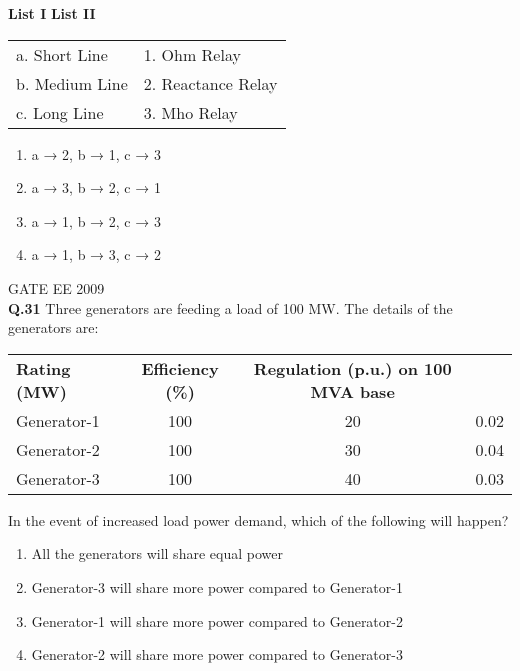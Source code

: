 \documentclass[12pt]{article}
\begin{document}
\vspace{0.3cm}

\noindent\textbf{List I} \hfill \textbf{List II}

\begin{tabular}{ll}
a. Short Line & 1. Ohm Relay \\
b. Medium Line & 2. Reactance Relay \\
c. Long Line & 3. Mho Relay \\
\end{tabular}

\vspace{0.3cm}

\begin{enumerate}
    \item a → 2, b → 1, c → 3
    \item a → 3, b → 2, c → 1
    \item a → 1, b → 2, c → 3
    \item a → 1, b → 3, c → 2
\end{enumerate}

\vspace{0.5cm}
\hspace{10pt}
GATE EE 2009\\
\noindent\textbf{Q.31} Three generators are feeding a load of 100 MW. The details of the generators are:

\vspace{0.3cm}

\begin{tabular}{lccc}
\textbf{Rating (MW)} & \textbf{Efficiency (\%)} & \textbf{Regulation (p.u.) on 100 MVA base} \\
Generator-1 & 100 & 20 & 0.02 \\
Generator-2 & 100 & 30 & 0.04 \\
Generator-3 & 100 & 40 & 0.03 \\
\end{tabular}

\vspace{0.3cm}

In the event of increased load power demand, which of the following will happen?

\begin{enumerate}
    \item All the generators will share equal power
    \item Generator-3 will share more power compared to Generator-1
    \item Generator-1 will share more power compared to Generator-2
    \item Generator-2 will share more power compared to Generator-3
\end{enumerate}
\end{document}
